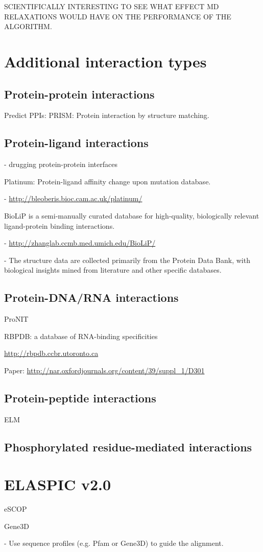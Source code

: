 SCIENTIFICALLY INTERESTING TO SEE WHAT EFFECT MD RELAXATIONS WOULD HAVE ON THE PERFORMANCE OF THE ALGORITHM.





\section{Additional interaction types}

\subsection{Protein-protein interactions}

Predict PPIs: PRISM: Protein interaction by structure matching.


\subsection{Protein-ligand interactions}

- drugging protein-protein interfaces \cite{wells_reaching_2007}

Platinum: Protein-ligand affinity change upon mutation database.

- \url{http://bleoberis.bioc.cam.ac.uk/platinum/}

BioLiP is a semi-manually curated database for high-quality, biologically relevant ligand-protein binding interactions.

- \url{http://zhanglab.ccmb.med.umich.edu/BioLiP/}

- The structure data are collected primarily from the Protein Data Bank, with biological insights mined from literature and other specific databases.


\subsection{Protein-DNA/RNA interactions}

ProNIT

RBPDB: a database of RNA-binding specificities

\url{http://rbpdb.ccbr.utoronto.ca}

Paper: \url{http://nar.oxfordjournals.org/content/39/suppl_1/D301}


\subsection{Protein-peptide interactions}

ELM


\subsection{Phosphorylated residue-mediated interactions}


\section{ELASPIC v2.0}

eSCOP

Gene3D

- Use sequence profiles (e.g. Pfam or Gene3D) to guide the alignment.
